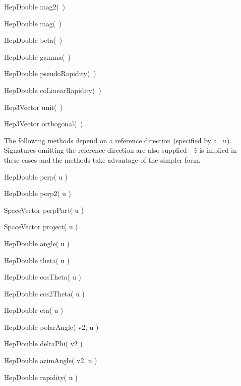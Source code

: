 \begin{shortlist}
  \item HepDouble mag2(~) \see{\ref{eq:mag2}}
  \item HepDouble mag(~) \see{\ref{eq:mag}, \ref{eq:mag:2}}
  \item HepDouble beta(~) \see{\ref{eq:beta}}
  \item HepDouble gamma(~) \see{\ref{eq:gamma}}
  \item HepDouble pseudoRapidity(~) \see{\ref{eq:spherical}}
  \item HepDouble coLinearRapidity(~) \see{\ref{eq:coLinRap}}
  \item Hep3Vector unit(~) \see{\ref{eq:svunit}}
  \item Hep3Vector orthogonal(~) \see{\ref{eq:orthogonal}}
\end{shortlist}

\noindent
The following methods depend on a reference direction
(specified by a \SV\ u).  Signatures omitting
the reference direction are also supplied---$\hat{z}$ is implied in these
cases and the methods take advantage of the simpler form.

\begin{shortlist}
  \item HepDouble perp( u ) \see{\ref{eq:perp}}
  \item HepDouble perp2( u ) \see{\ref{eq:perp2}}
  \item SpaceVector perpPart( u ) \see{\ref{eq:perpPart}}
  \item SpaceVector project( u ) \see{\ref{eq:project}}
  \item HepDouble angle( u ) \see{\ref{eq:angle}}
  \item HepDouble theta( u ) \see{\ref{eq:theta}}
  \item HepDouble cosTheta( u ) \see{\ref{eq:cosTheta}}
  \item HepDouble cos2Theta( u ) \see{\ref{eq:cos2Theta}}
  \item HepDouble eta( u ) \see{\ref{eq:eta}, \ref{eq:eta:2}, \ref{eq:eta:3}, \ref{eq:eta:4}}
  \item HepDouble polarAngle( v2, u ) \see{\ref{eq:polarA}, \ref{eq:polarA:2}}
  \item HepDouble deltaPhi( v2 ) \see{\ref{eq:azim}}
  \item HepDouble azimAngle( v2, u ) \see{\ref{eq:azim}, \ref{eq:azim:2}}
  \item HepDouble rapidity( u ) \see{\ref{eq:rap}, \ref{eq:rap:2}}
\end{shortlist}

